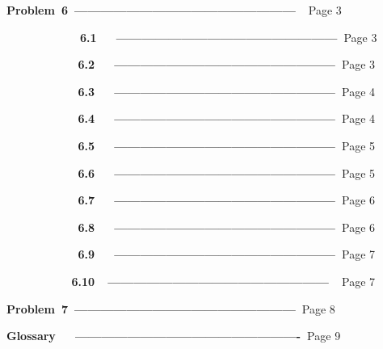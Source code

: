 \documentclass[12pt]{article}
\begin{document}
\setlength{\parskip}{0.0pt}
\textbf{Problem\ 6\   ---------------------------------------------------\ \  }Page 3\par

\ \ \ \ \ \ \ \ \ \  \ \ \    \textbf{6.1\ \ \ ---------------------------------------------------\   }Page 3{\fontsize{13pt}{15.6pt}\selectfont \textbf{ }\par}\par

\setlength{\parskip}{2.04pt}
{\fontsize{13pt}{15.6pt}\selectfont \textbf{\ \ \ \ \ \ \ \ \ \ \  6.2\ \ \ ---------------------------------------------------\   }Page 3\par}\par

\textbf{\ \ \ \ \ \ \ \ \ \      \  6.3\ \ \ ---------------------------------------------------\   }Page 4\par

\textbf{\ \ \ \ \ \ \ \ \ \ \  6.4\ \ \ ---------------------------------------------------\   }Page 4\par

\textbf{\ \ \ \ \ \ \ \ \ \ \  6.5\ \ \ ---------------------------------------------------\   }Page 5\par

\textbf{\ \ \ \ \ \ \ \ \ \ \  6.6\ \ \ ---------------------------------------------------\   }Page 5\par

\textbf{\ \ \ \ \ \ \ \ \ \ \  6.7\ \ \ ---------------------------------------------------\   }Page 6\par

\textbf{\ \ \ \ \ \ \ \ \ \ \  6.8\ \ \ ---------------------------------------------------\   }Page 6\par

\textbf{\ \ \ \ \ \ \ \ \ \ \  6.9\ \ \ ---------------------------------------------------\   }Page 7\par

\textbf{\ \ \ \ \ \ \ \ \ \  6.10\ \  ---------------------------------------------------\ \  }Page 7\par


\vspace{\baselineskip}
\textbf{ Problem\ 7\   ---------------------------------------------------\   }Page 8\par


\vspace{\baselineskip}
\textbf{ Glossary\  \ \ ----------------------------------------------------\   }Page 9\par
\end{document}

